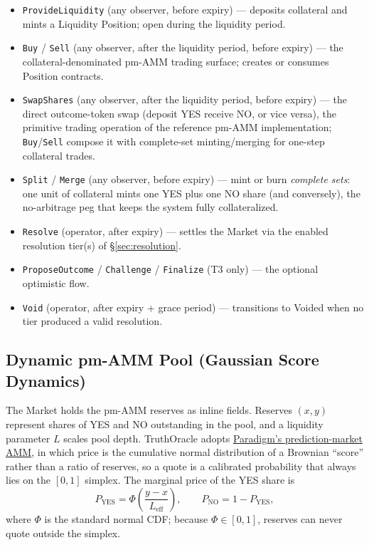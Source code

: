 \documentclass[11pt,a4paper]{article}
\begin{document}
\begin{itemize}[leftmargin=2em, itemsep=2pt]
\item \texttt{ProvideLiquidity} (any observer, before expiry) --- deposits collateral and mints a Liquidity Position; open during the liquidity period.
\item \texttt{Buy} / \texttt{Sell} (any observer, after the liquidity period, before expiry) --- the collateral-denominated pm-AMM trading surface; creates or consumes Position contracts.
\item \texttt{SwapShares} (any observer, after the liquidity period, before expiry) --- the direct outcome-token swap (deposit YES receive NO, or vice versa), the primitive trading operation of the reference pm-AMM implementation; \texttt{Buy}/\texttt{Sell} compose it with complete-set minting/merging for one-step collateral trades.
\item \texttt{Split} / \texttt{Merge} (any observer, before expiry) --- mint or burn \emph{complete sets}: one unit of collateral mints one YES plus one NO share (and conversely), the no-arbitrage peg that keeps the system fully collateralized.
\item \texttt{Resolve} (operator, after expiry) --- settles the Market via the enabled resolution tier(s) of \S\ref{sec:resolution}.
\item \texttt{ProposeOutcome} / \texttt{Challenge} / \texttt{Finalize} (T3 only) --- the optional optimistic flow.
\item \texttt{Void} (operator, after expiry + grace period) --- transitions to Voided when no tier produced a valid resolution.
\end{itemize}

\subsection{Dynamic pm-AMM Pool (Gaussian Score Dynamics)}

The Market holds the pm-AMM reserves as inline fields. Reserves $(x, y)$ represent shares of YES and NO outstanding in the pool, and a liquidity parameter $L$ scales pool depth. TruthOracle adopts \href{https://www.paradigm.xyz/2024/11/pm-amm}{Paradigm's prediction-market AMM}, in which price is the cumulative normal distribution of a Brownian ``score'' rather than a ratio of reserves, so a quote is a calibrated probability that always lies on the $[0,1]$ simplex. The marginal price of the YES share is
\[
P_{\mathrm{YES}} = \Phi\!\left(\frac{y - x}{L_{\mathrm{eff}}}\right), \qquad P_{\mathrm{NO}} = 1 - P_{\mathrm{YES}},
\]
where $\Phi$ is the standard normal CDF; because $\Phi \in [0,1]$, reserves can never quote outside the simplex.
\end{document}
